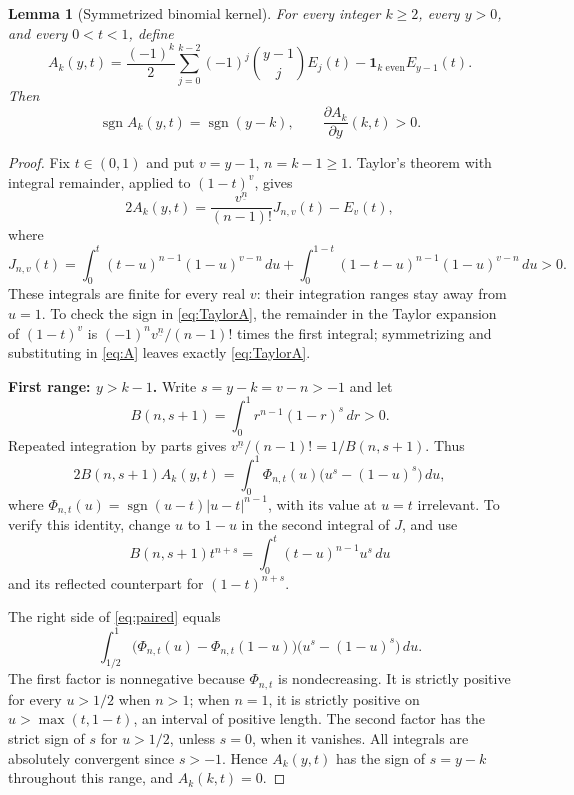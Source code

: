 \documentclass[11pt]{article}
\newtheorem{lemma}[theorem]{Lemma}
\theoremstyle{definition}
\newcommand{\fall}[2]{#1^{\underline{#2}}}
\newcommand{\sgn}{\operatorname{sgn}}
\newcommand{\ind}{\mathbf 1}
\begin{document}
\begin{lemma}[Symmetrized binomial kernel]\label{lem:kernel}
For every integer $k\ge2$, every $y>0$, and every $0<t<1$, define
\begin{equation}\label{eq:A}
 A_k(y,t)=\frac{(-1)^k}{2}\sum_{j=0}^{k-2}(-1)^j\binom{y-1}{j}E_j(t)
                  -\ind_{k\text{ even}}E_{y-1}(t).
\end{equation}
Then
\begin{equation}\label{eq:signA}
 \sgn A_k(y,t)=\sgn(y-k),\qquad
 \frac{\partial A_k}{\partial y}(k,t)>0.
\end{equation}
\end{lemma}
\begin{proof}
Fix $t\in(0,1)$ and put $v=y-1$, $n=k-1\ge1$. Taylor's theorem with integral remainder, applied to $(1-t)^v$, gives
\begin{equation}\label{eq:TaylorA}
 2A_k(y,t)=\frac{\fall{v}{n}}{(n-1)!}J_{n,v}(t)-E_v(t),
\end{equation}
where
\[
 J_{n,v}(t)=\int_0^t(t-u)^{n-1}(1-u)^{v-n}\,du
 +\int_0^{1-t}(1-t-u)^{n-1}(1-u)^{v-n}\,du>0.
\]
These integrals are finite for every real $v$: their integration ranges stay away from $u=1$. To check the sign in \eqref{eq:TaylorA}, the remainder in the Taylor expansion of $(1-t)^v$ is $(-1)^n\fall vn/(n-1)!$ times the first integral; symmetrizing and substituting in \eqref{eq:A} leaves exactly \eqref{eq:TaylorA}.

\medskip\noindent\textbf{First range: $y>k-1$.}
Write $s=y-k=v-n>-1$ and let
\[
 B(n,s+1)=\int_0^1r^{n-1}(1-r)^s\,dr>0.
\]
Repeated integration by parts gives $\fall vn/(n-1)!=1/B(n,s+1)$. Thus
\begin{equation}\label{eq:paired}
 2B(n,s+1)A_k(y,t)
 =\int_0^1\Phi_{n,t}(u)\bigl(u^s-(1-u)^s\bigr)\,du,
\end{equation}
where $\Phi_{n,t}(u)=\sgn(u-t)|u-t|^{n-1}$, with its value at $u=t$ irrelevant. To verify this identity, change $u$ to $1-u$ in the second integral of $J$, and use
\[
 B(n,s+1)t^{n+s}=\int_0^t(t-u)^{n-1}u^s\,du
\]
and its reflected counterpart for $(1-t)^{n+s}$.

The right side of \eqref{eq:paired} equals
\begin{equation}\label{eq:pairhalf}
 \int_{1/2}^1\bigl(\Phi_{n,t}(u)-\Phi_{n,t}(1-u)\bigr)
                    \bigl(u^s-(1-u)^s\bigr)\,du.
\end{equation}
The first factor is nonnegative because $\Phi_{n,t}$ is nondecreasing. It is strictly positive for every $u>1/2$ when $n>1$; when $n=1$, it is strictly positive on $u>\max(t,1-t)$, an interval of positive length. The second factor has the strict sign of $s$ for $u>1/2$, unless $s=0$, when it vanishes. All integrals are absolutely convergent since $s>-1$. Hence $A_k(y,t)$ has the sign of $s=y-k$ throughout this range, and $A_k(k,t)=0$.


\end{proof}
\end{document}
